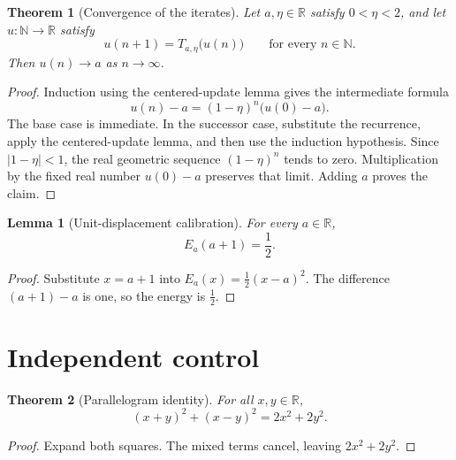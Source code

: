 \documentclass[11pt]{article}
\newtheorem{lemma}{Lemma}
\newtheorem{theorem}{Theorem}
\newcommand{\R}{\mathbb{R}}
\newcommand{\N}{\mathbb{N}}
\begin{document}
\begin{theorem}[Convergence of the iterates]\label{thm:descent-converges}
Let $a,\eta\in\R$ satisfy $0<\eta<2$, and let $u:\N\to\R$
satisfy
\[
  u(n+1)=T_{a,\eta}\bigl(u(n)\bigr)
  \qquad\text{for every }n\in\N.
\]
Then $u(n)\to a$ as $n\to\infty$.
\end{theorem}
\begin{proof}
Induction using the centered-update lemma gives the intermediate formula
\[
  u(n)-a=(1-\eta)^n\bigl(u(0)-a\bigr).
\]
The base case is immediate. In the successor case, substitute the recurrence,
apply the centered-update lemma, and then use the induction hypothesis.
Since $|1-\eta|<1$, the real geometric sequence $(1-\eta)^n$ tends
to zero. Multiplication by the fixed real number $u(0)-a$ preserves
that limit. Adding $a$ proves the claim.
\end{proof}

\begin{lemma}[Unit-displacement calibration]\label{lem:descent-calibration}
For every $a\in\R$,
\[
  E_a(a+1)=\frac12.
\]
\end{lemma}
\begin{proof}
Substitute $x=a+1$ into $E_a(x)=\frac12(x-a)^2$.
The difference $(a+1)-a$ is one, so the energy is $\frac12$.
\end{proof}

\section{Independent control}

\begin{theorem}[Parallelogram identity]\label{thm:independent-square}
For all $x,y\in\R$,
\[
  (x+y)^2+(x-y)^2=2x^2+2y^2.
\]
\end{theorem}
\begin{proof}
Expand both squares. The mixed terms cancel, leaving $2x^2+2y^2$.
\end{proof}
\end{document}
